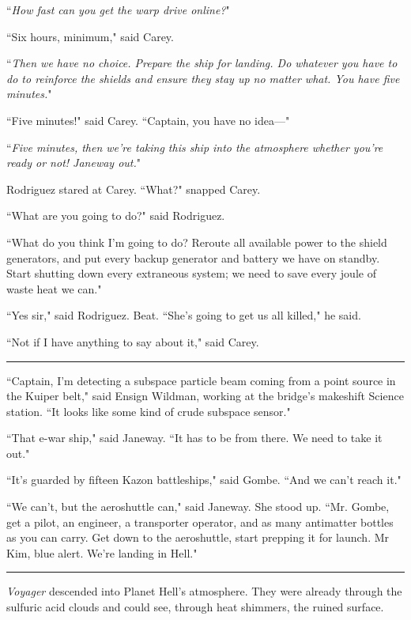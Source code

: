 \documentclass[twoside,letterpaper,12pt]{memoir}
\begin{document}
``\textit{How fast can you get the warp drive online?}"

``Six hours, minimum," said Carey.

``\textit{Then we have no choice. Prepare the ship for landing. Do whatever you have to do to reinforce the shields and ensure they stay up no matter what. You have five minutes.}"

``Five minutes!" said Carey. ``Captain, you have no idea---"

``\textit{Five minutes, then we're taking this ship into the atmosphere whether you're ready or not! Janeway out.}"

Rodriguez stared at Carey. ``What?" snapped Carey.

``What are you going to do?" said Rodriguez.

``What do you think I'm going to do? Reroute all available power to the shield generators, and put every backup generator and battery we have on standby. Start shutting down every extraneous system; we need to save every joule of waste heat we can."

``Yes sir," said Rodriguez. Beat. ``She's going to get us all killed," he said.

``Not if I have anything to say about it," said Carey.

\begin{center}\rule{3cm}{0.4 pt}\end{center}

``Captain, I'm detecting a subspace particle beam coming from a point source in the Kuiper belt," said Ensign Wildman, working at the bridge's makeshift Science station. ``It looks like some kind of crude subspace sensor."

``That e-war ship," said Janeway. ``It has to be from there. We need to take it out."

``It's guarded by fifteen Kazon battleships," said Gombe. ``And we can't reach it."

``We can't, but the aeroshuttle can," said Janeway. She stood up. ``Mr. Gombe, get a pilot, an engineer, a transporter operator, and as many antimatter bottles as you can carry. Get down to the aeroshuttle, start prepping it for launch. Mr Kim, blue alert. We're landing in Hell."

\begin{center}\rule{3cm}{0.4 pt}\end{center}

\textit{Voyager} descended into Planet Hell's atmosphere. They were already through the sulfuric acid clouds and could see, through heat shimmers, the ruined surface.
\end{document}
